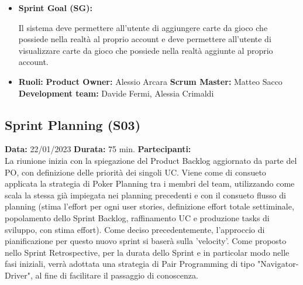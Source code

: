 \begin{landscape}
        \begin{itemize}
            \item \textbf{Sprint Goal (SG):}
            \begin{indent}
                \newline Il sistema deve permettere all’utente di aggiungere carte da gioco che possiede nella realtà al proprio account e deve permettere all’utente di visualizzare carte da gioco che possiede nella realtà aggiunte al proprio account.
            \end{indent}
        \end{itemize}
        \begin{itemize}
            \item \textbf{Ruoli:}
            \newline \textbf{Product Owner:} Alessio Arcara
            \newline \textbf{Scrum Master:} Matteo Sacco
            \newline \textbf{Development team:} Davide Fermi, Alessia Crimaldi
        \end{itemize}
        \vspace{5mm} %
        \subsection{Sprint Planning (S03)}
        \textbf{Data:} 22/01/2023
        \newline \textbf{Durata:} 75 min.
        \newline \textbf{Partecipanti:} \treP \tre
        \\
        \newline La riunione inizia con la spiegazione del Product Backlog aggiornato da parte del PO, con definizione delle priorità dei singoli UC. Viene come di consueto applicata la strategia di Poker Planning tra i membri del team, utilizzando come scala la stessa già impiegata nei planning precedenti e con il consueto flusso di planning (stima l'effort per ogni user stories, definizione effort totale settiminale, popolamento dello Sprint Backlog, raffinamento UC e produzione tasks di sviluppo, con stima effort). Come deciso precedentemente, l'approccio di pianificazione per questo nuovo sprint si baserà sulla 'velocity'.
        \newline Come proposto nello Sprint Retrospective, per la durata dello Sprint e in particolar modo nelle fasi iniziali, verrà adottata una strategia di Pair Programming di tipo "Navigator-Driver", al fine di facilitare il passaggio di conoscenza.


\end{landscape}

